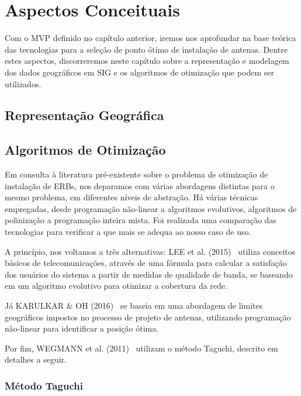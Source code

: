 \documentclass[]{politex}
\begin{document}
\chapter{Aspectos Conceituais}

Com o MVP definido no capítulo anterior, iremos nos aprofundar na base teórica
das tecnologias para a seleção de ponto ótimo de instalação de antenas. Dentre
estes aspectos, discorreremos neste capítulo sobre a representação e modelagem
dos dados geográficos em SIG e os algoritmos de otimização que podem ser
utilizados.

\section{Representação Geográfica}


\section{Algoritmos de Otimização}

Em consulta à literatura pré-existente sobre o problema de otimização de
instalação de ERBs, nos deparamos com várias abordagens distintas para o mesmo
problema, em diferentes níveis de abstração. Há várias técnicas empregadas,
desde programação não-linear a algoritmos evolutivos, algoritmos de polinização
a programação inteira mista. Foi realizada uma comparação das tecnologias para
verificar a que mais se adequa ao nosso caso de uso.

A princípio, nos voltamos a três alternativas: LEE et al. (2015)~
\cite{evolutivo} utiliza conceitos básicos de telecomunicações, através de uma
fórmula para calcular a satisfação dos usuários do sistema a partir de medidas
de qualidade de banda, se baseando em um algoritmo evolutivo para otimizar
a cobertura da rede.

Já KARULKAR \& OH (2016)~\cite{nao-linear} se baseia em uma abordagem de limites
geográficos impostos no processo de projeto de antenas, utilizando programação
não-linear para identificar a posição ótima.

Por fim, WEGMANN et al. (2011)~\cite{taguchi} utilizam o método Taguchi,
descrito em detalhes a seguir.

\subsection{Método Taguchi}
\end{document}
